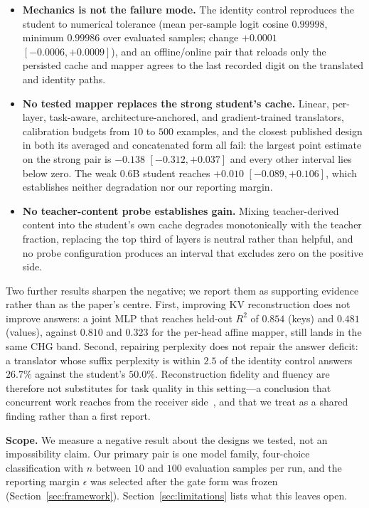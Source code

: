 \documentclass[10pt]{article}
\newcommand{\kv}{\ensuremath{\mathrm{KV}}}
\begin{document}
\begin{itemize}
\item \textbf{Mechanics is not the failure mode.} The identity control
reproduces the student to numerical tolerance (mean per-sample logit cosine
$0.99998$, minimum $0.99986$ over evaluated samples; change $+0.0001$
$[-0.0006,+0.0009]$), and an offline/online pair that reloads only the persisted
cache and mapper agrees to the last recorded digit on the translated and
identity paths.
\item \textbf{No tested mapper replaces the strong student's cache.} Linear,
per-layer, task-aware, architecture-anchored, and gradient-trained
translators, calibration budgets from $10$ to $500$ examples, and the closest
published design in both its averaged and concatenated form all fail: the
largest point estimate on the strong pair is $-0.138$ $[-0.312,+0.037]$ and
every other interval lies below zero. The weak $0.6$B student reaches $+0.010$
$[-0.089,+0.106]$, which establishes neither degradation nor our reporting
margin.
\item \textbf{No teacher-content probe establishes gain.} Mixing teacher-derived
content into the student's own cache degrades monotonically with the teacher
fraction, replacing the top third of layers is neutral rather than helpful, and
no probe configuration produces an interval that excludes zero on the positive
side.
\end{itemize}

Two further results sharpen the negative; we report them as supporting evidence
rather than as the paper's centre. First, improving \kv{}
reconstruction does not improve answers: a joint MLP that reaches held-out
$R^2$ of $0.854$ (keys) and $0.481$ (values), against $0.810$ and $0.323$ for
the per-head affine mapper, still lands in the same CHG band. Second, repairing
perplexity does not repair the answer deficit: a translator whose suffix
perplexity is within $2.5$ of the identity control answers $26.7\%$ against the
student's $50.0\%$. Reconstruction fidelity and fluency are therefore not
substitutes for task quality in this setting---a conclusion that concurrent
work reaches from the receiver side~\citep{cachelink2026}, and that we treat as
a shared finding rather than a first report.

\textbf{Scope.} We measure a negative result about the designs we tested, not
an impossibility claim. Our primary pair is one model family, four-choice
classification with $n$ between $10$ and $100$ evaluation samples per run, and
the reporting margin $\epsilon$ was selected after the gate form was frozen
(Section~\ref{sec:framework}). Section~\ref{sec:limitations} lists what this
leaves open.
\end{document}
